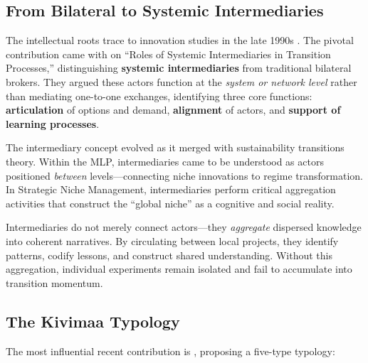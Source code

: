 \documentclass[../main.tex]{subfiles}
\begin{document}
\subsection{From Bilateral to Systemic Intermediaries}

The intellectual roots trace to innovation studies in the late 1990s \cite{howells2006intermediation}. The pivotal contribution came with \textcite{vanLente2003roles} on ``Roles of Systemic Intermediaries in Transition Processes,'' distinguishing \textbf{systemic intermediaries} from traditional bilateral brokers. They argued these actors function at the \emph{system or network level} rather than mediating one-to-one exchanges, identifying three core functions: \textbf{articulation} of options and demand, \textbf{alignment} of actors, and \textbf{support of learning processes}.

The intermediary concept evolved as it merged with sustainability transitions theory. Within the MLP, intermediaries came to be understood as actors positioned \emph{between} levels---connecting niche innovations to regime transformation. In Strategic Niche Management, intermediaries perform critical aggregation activities that construct the ``global niche'' as a cognitive and social reality.

\begin{insightbox}
Intermediaries do not merely connect actors---they \emph{aggregate} dispersed knowledge into coherent narratives. By circulating between local projects, they identify patterns, codify lessons, and construct shared understanding. Without this aggregation, individual experiments remain isolated and fail to accumulate into transition momentum.
\end{insightbox}

\subsection{The Kivimaa Typology}

The most influential recent contribution is \textcite{kivimaa2019innovation}, proposing a five-type typology:

\end{document}

